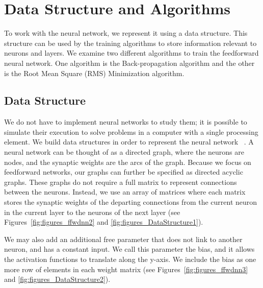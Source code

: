 \documentclass[11pt]{article}
\begin{document}


\section{Data Structure and Algorithms} %
\label{sec:data_structure_and_algorithms}

To work with the neural network, we represent it using a data structure. This structure can be used by the training algorithms to store
information relevant to neurons and layers. We examine two different algorithms to train the feedforward neural network. One algorithm
is the Back-propagation algorithm and the other is the Root Mean Square (RMS) Minimization algorithm.

\subsection{Data Structure} %
\label{sub:data_structure}

We do not have to implement neural networks to study them; it is possible to simulate their execution to solve problems in a computer
with a single processing element. We build data structures in order to represent the neural network~\cite{skapura} . A neural network can be thought of
as a directed graph, where the neurons are nodes, and the synaptic weights are the arcs of the graph. Because we focus on feedforward
networks, our graphs can further be specified as directed acyclic graphs. These graphs do not require a full matrix to represent
connections between the neurons. Instead, we use an array of matrices where each matrix stores the synaptic weights of the departing
connections from the current neuron in the current layer to the neurons of the next layer (see Figures~\ref{fig:figures_ffwdnn2} and
\ref{fig:figures_DataStructure1}).

We may also add an additional free parameter that does not link to another neuron, and has a constant input. We call this parameter the
bias, and it allows the activation functions to translate along the y-axis. We include the bias as one more row of elements in each
weight matrix (see Figures~\ref{fig:figures_ffwdnn3} and \ref{fig:figures_DataStructure2}).
\end{document}

